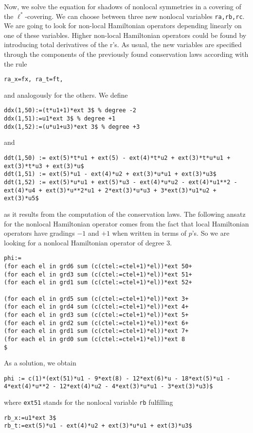 Now, we solve the equation for shadows of nonlocal symmetries in a covering of
the $\ell^*$-covering. We can choose between three new nonlocal variables
\texttt{ra,rb,rc}. We are going to look for non-local Hamiltonian operators
depending linearly on one of these variables. Higher non-local Hamiltonian 
operators could be found by introducing total derivatives of the r's.
As usual, the new variables are specified through the components of the 
previously found conservation laws according with the rule
\begin{verbatim}
ra_x=fx, ra_t=ft,
\end{verbatim}
and analogously for the others. We define
\begin{verbatim}
ddx(1,50):=(t*u1+1)*ext 3$ % degree -2
ddx(1,51):=u1*ext 3$ % degree +1
ddx(1,52):=(u*u1+u3)*ext 3$ % degree +3
\end{verbatim}
and
\begin{verbatim}
ddt(1,50) := ext(5)*t*u1 + ext(5) - ext(4)*t*u2 + ext(3)*t*u*u1 +
ext(3)*t*u3 + ext(3)*u$
ddt(1,51) := ext(5)*u1 - ext(4)*u2 + ext(3)*u*u1 + ext(3)*u3$
ddt(1,52) := ext(5)*u*u1 + ext(5)*u3 - ext(4)*u*u2 - ext(4)*u1**2 -
ext(4)*u4 + ext(3)*u**2*u1 + 2*ext(3)*u*u3 + 3*ext(3)*u1*u2 + ext(3)*u5$
\end{verbatim}
as it results from the computation of the conservation laws.
The following ansatz for the nonlocal Hamiltonian operator
comes from the fact that local Hamiltonian operators have 
gradings $-1$ and $+1$ when written in terms of $p$'s. So we are looking 
for a nonlocal Hamiltonian operator of degree $3$.
\begin{verbatim}
phi:=
(for each el in grd6 sum (c(ctel:=ctel+1)*el))*ext 50+
(for each el in grd3 sum (c(ctel:=ctel+1)*el))*ext 51+
(for each el in grd1 sum (c(ctel:=ctel+1)*el))*ext 52+

(for each el in grd5 sum (c(ctel:=ctel+1)*el))*ext 3+
(for each el in grd4 sum (c(ctel:=ctel+1)*el))*ext 4+
(for each el in grd3 sum (c(ctel:=ctel+1)*el))*ext 5+
(for each el in grd2 sum (c(ctel:=ctel+1)*el))*ext 6+
(for each el in grd1 sum (c(ctel:=ctel+1)*el))*ext 7+
(for each el in grd0 sum (c(ctel:=ctel+1)*el))*ext 8
$
\end{verbatim}
As a solution, we obtain
\begin{verbatim}
phi := c(1)*(ext(51)*u1 - 9*ext(8) - 12*ext(6)*u - 18*ext(5)*u1 -
4*ext(4)*u**2 - 12*ext(4)*u2 - 4*ext(3)*u*u1 - 3*ext(3)*u3)$
\end{verbatim}
where \texttt{ext51} stands for the nonlocal variable \texttt{rb} fulfilling
\begin{verbatim}
rb_x:=u1*ext 3$
rb_t:=ext(5)*u1 - ext(4)*u2 + ext(3)*u*u1 + ext(3)*u3$
\end{verbatim}


